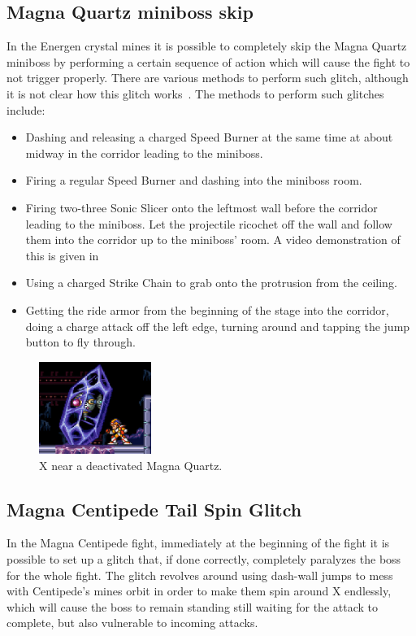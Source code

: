 \subsection{Magna Quartz miniboss skip}\label{ssect:Quartz_skip}
In the Energen crystal mines it is possible to completely skip the Magna Quartz miniboss by performing a certain sequence of action which will cause the fight to not trigger properly. There are various methods to perform such glitch, although it is not clear how this glitch works~\cite{rta:x2}.
The methods to perform such glitches include:
\begin{itemize}
	\item Dashing and releasing a charged Speed Burner at the same time at about midway in the corridor leading to the miniboss.
	\item Firing a regular Speed Burner and dashing into the miniboss room.
	\item Firing two-three Sonic Slicer onto the leftmost wall before the corridor leading to the miniboss. Let the projectile ricochet off the wall and follow them into the corridor up to the miniboss' room. A video demonstration of this is given in 
	\item Using a charged Strike Chain to grab onto the protrusion from the ceiling.
	\item Getting the ride armor from the beginning of the stage into the corridor, doing a charge attack off the left edge, turning around and tapping the jump button to fly through.
\end{itemize}
\begin{figure}[htp]
	\centering
	\includegraphics[height=3cm]{figures/X2/Crystal_snail/snail_skip.png}
	\caption{X near a deactivated Magna Quartz.}
\end{figure}

\subsection{Magna Centipede Tail Spin Glitch}
In the Magna Centipede fight, immediately at the beginning of the fight it is possible to set up a glitch that, if done correctly, completely paralyzes the boss for the whole fight. The glitch revolves around using dash-wall jumps to mess with Centipede's mines orbit in order to make them spin around X endlessly, which will cause the boss to remain standing still waiting for the attack to complete, but also vulnerable to incoming attacks. 

